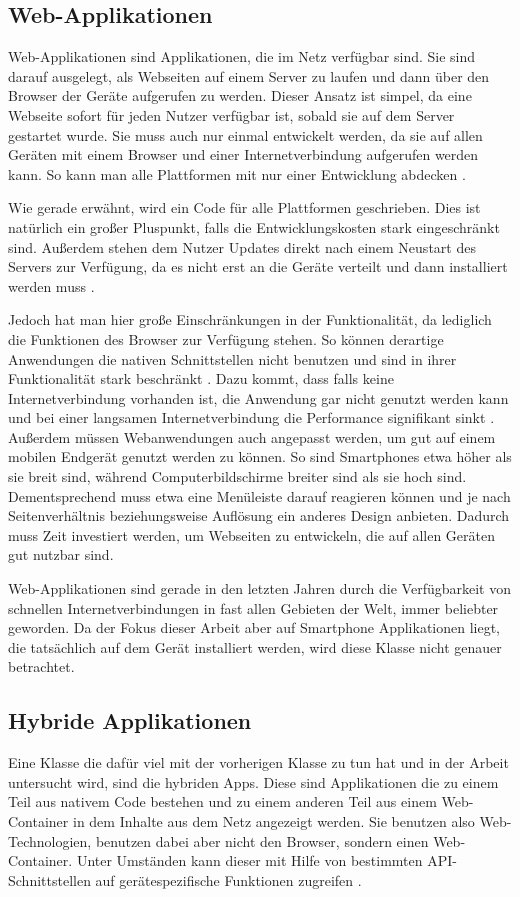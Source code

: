 \subsection{Web-Applikationen}
Web-Applikationen sind Applikationen, die im Netz verfügbar sind. Sie sind darauf ausgelegt, als Webseiten auf einem Server zu laufen und dann über den Browser der Geräte aufgerufen zu werden. Dieser Ansatz ist simpel, da eine Webseite sofort für jeden Nutzer verfügbar ist, sobald sie auf dem Server gestartet wurde. Sie muss auch nur einmal entwickelt werden, da sie auf allen Geräten mit einem Browser und einer Internetverbindung aufgerufen werden kann. So kann man alle Plattformen mit nur einer Entwicklung abdecken \cite{IEEE_development_classes}.

Wie gerade erwähnt, wird ein Code für alle Plattformen geschrieben. Dies ist natürlich ein großer Pluspunkt, falls die Entwicklungskosten stark eingeschränkt sind. Außerdem stehen dem Nutzer Updates direkt nach einem Neustart des Servers zur Verfügung, da es nicht erst an die Geräte verteilt und dann installiert werden muss \cite{IEEE_Khackouch_Al}.

Jedoch hat man hier große Einschränkungen in der Funktionalität, da lediglich die Funktionen des Browser zur Verfügung stehen. So können derartige Anwendungen die nativen Schnittstellen nicht benutzen und sind in ihrer Funktionalität stark beschränkt \cite{Phyo}. Dazu kommt, dass falls keine Internetverbindung vorhanden ist, die Anwendung gar nicht genutzt werden kann und bei einer langsamen Internetverbindung die Performance signifikant sinkt \cite{IEEE_Khackouch_Al}. Außerdem müssen Webanwendungen auch angepasst werden, um gut auf einem mobilen Endgerät genutzt werden zu können. So sind Smartphones etwa höher als sie breit sind, während Computerbildschirme breiter sind als sie hoch sind. Dementsprechend muss etwa eine Menüleiste darauf reagieren können und je nach Seitenverhältnis beziehungsweise Auflösung ein anderes Design anbieten. Dadurch muss Zeit investiert werden, um Webseiten zu entwickeln, die auf allen Geräten gut nutzbar sind.

Web-Applikationen sind gerade in den letzten Jahren durch die Verfügbarkeit von schnellen Internetverbindungen in fast allen Gebieten der Welt, immer beliebter geworden. Da der Fokus dieser Arbeit aber auf Smartphone Applikationen liegt, die tatsächlich auf dem Gerät installiert werden, wird diese Klasse nicht genauer betrachtet.

\newpage

\subsection{Hybride Applikationen}
Eine Klasse die dafür viel mit der vorherigen Klasse zu tun hat und in der Arbeit untersucht wird, sind die hybriden Apps. Diese sind Applikationen die zu einem Teil aus nativem Code bestehen und zu einem anderen Teil aus einem Web-Container in dem Inhalte aus dem Netz angezeigt werden. Sie benutzen also Web-Technologien, benutzen dabei aber nicht den Browser, sondern einen Web-Container. Unter Umständen kann dieser mit Hilfe von bestimmten API-Schnittstellen auf gerätespezifische Funktionen zugreifen \cite{IEEE_development_classes}.

